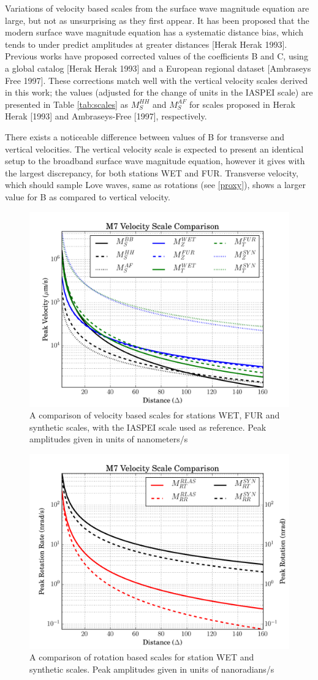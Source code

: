 \documentclass{gji}
\begin{document}
Variations of velocity based scales from the surface wave magnitude equation are large, but not as unsurprising as they first appear. It has been proposed that the modern surface wave magnitude equation has a systematic distance bias, which tends to under predict amplitudes at greater distances [Herak Herak 1993]. Previous works have proposed corrected values of the coefficients B and C, using a global catalog [Herak Herak 1993] and a European regional dataset [Ambraseys Free 1997]. These corrections match well with the vertical velocity scales derived in this work; the values (adjusted for the change of units in the IASPEI scale) are presented in Table \ref{tab:scales} as $M_S^{HH}$ and $M_S^{AF}$ for scales proposed in Herak Herak [1993] and Ambraseys-Free [1997], respectively. 

There exists a noticeable difference between values of B for transverse and vertical velocities. The vertical velocity scale is expected to present an identical setup to the broadband surface wave magnitude equation, however it gives with the largest discrepancy, for both stations WET and FUR.  Transverse velocity, which should sample Love waves, same as rotations (see \ref{proxy}), shows a larger value for B as compared to vertical velocity.

\begin{figure}
\centerline{\includegraphics[width=.5\textwidth]{velocityscales}}
\caption{A comparison of velocity based scales for stations WET, FUR and synthetic scales, with the IASPEI scale used as reference. Peak amplitudes given in units of nanometers/s}
\label{fig:vel_scale}
\end{figure}

\begin{figure}
\centerline{\includegraphics[width=.5\textwidth]{rrscales}}
\caption{A comparison of rotation based scales for station WET and synthetic scales. Peak amplitudes given in units of nanoradians/s}
\label{fig:rr_scale}
\end{figure}
\end{document}
